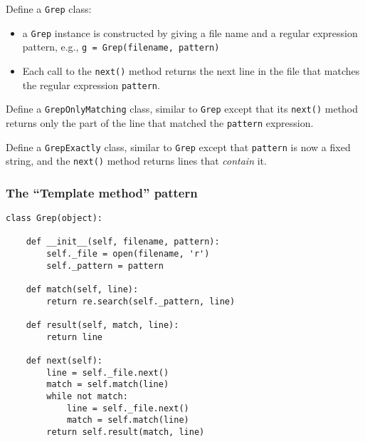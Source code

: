 \documentclass[english,serif,mathserif,xcolor=pdftex,dvipsnames,table]{beamer}
\begin{document}
\begin{frame}[fragile]
  \begin{exercise}
    Define a \texttt{Grep} class:
    \begin{itemize}
    \item a \texttt{Grep} instance is constructed by giving a file name and a regular expression pattern, e.g., \lstinline|g = Grep(filename, pattern)|
    \item Each call to the \texttt{next()} method returns the next line in the file that matches the regular expression \texttt{pattern}.
    \end{itemize}
  \end{exercise}

  \+
  \begin{exercise}
    Define a \texttt{GrepOnlyMatching} class, similar to \texttt{Grep}
    except that its \texttt{next()} method returns only the part of
    the line that matched the \texttt{pattern} expression.
  \end{exercise}

  \+
  \begin{exercise}
    Define a \texttt{GrepExactly} class, similar to \texttt{Grep}
    except that \texttt{pattern} is now a fixed string, and the
    \texttt{next()} method returns lines that \emph{contain} it.
  \end{exercise}
\end{frame}


\begin{frame}[fragile]
  \frametitle{The ``Template method'' pattern}
\begin{lstlisting}
class Grep(object):

    def __init__(self, filename, pattern):
        self._file = open(filename, 'r')
        self._pattern = pattern

    def match(self, line):
        return re.search(self._pattern, line)

    def result(self, match, line):
        return line

    def next(self):
        line = self._file.next()
        match = self.match(line)
        while not match:
            line = self._file.next()
            match = self.match(line)
        return self.result(match, line)
\end{lstlisting}
\end{frame}
\end{document}
